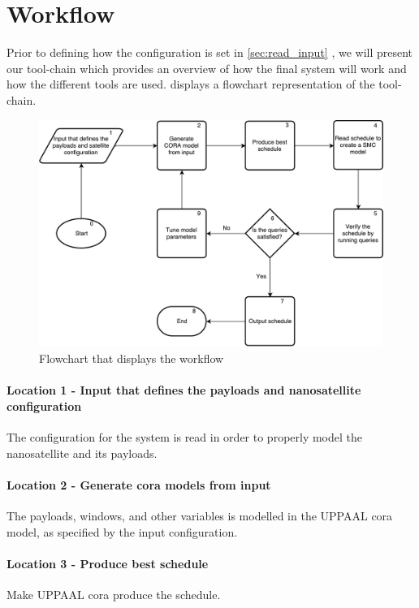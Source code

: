 \section{Workflow} \label{subsec:tool_chainv}
Prior to defining how the configuration is set in \cref{sec:read_input} , we will present our tool-chain which provides an overview of how the final system will work and how the different tools are used.
 displays a flowchart representation of the tool-chain.

\begin{figure}[h]
	\includegraphics[width=\textwidth]{graphics/flow_final.pdf}
	\caption{Flowchart that displays the workflow}
	\label{fig:tool1}
\end{figure}

\paragraph{Location 1 - Input that defines the payloads and nanosatellite configuration} 
The configuration for the system is read in order to properly model the nanosatellite and its payloads.

\paragraph{Location 2 - Generate \gls{cora} models from input} 
The payloads, windows, and other variables is modelled in the UPPAAL \gls{cora} model, as specified by the input configuration.

\paragraph{Location 3 - Produce best schedule} 
Make UPPAAL \gls{cora}  produce the schedule.

